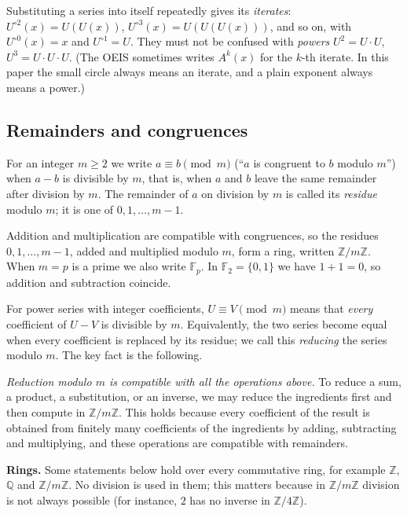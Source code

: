 \documentclass[11pt,a4paper]{article}
\theoremstyle{definition}
\theoremstyle{remark}
\newcommand{\Z}{\mathbb{Z}}
\newcommand{\Q}{\mathbb{Q}}
\newcommand{\F}{\mathbb{F}}
\newcommand{\para}[1]{\par\medskip\noindent\textbf{#1}\enspace}
\begin{document}
Substituting a series into itself repeatedly gives its \emph{iterates}: $U^{\circ2}(x)=U(U(x))$,
$U^{\circ3}(x)=U(U(U(x)))$, and so on, with $U^{\circ0}(x)=x$ and $U^{\circ1}=U$. They must not be confused with
\emph{powers} $U^2=U\cdot U$, $U^3=U\cdot U\cdot U$. (The OEIS sometimes writes $A^k(x)$ for the $k$-th iterate. In
this paper the small circle always means an iterate, and a plain exponent always means a power.)

\subsection{Remainders and congruences}
For an integer $m\ge2$ we write $a\equiv b\pmod m$ (``$a$ is congruent to $b$ modulo $m$'') when $a-b$ is divisible by
$m$, that is, when $a$ and $b$ leave the same remainder after division by $m$. The remainder of $a$ on division by
$m$ is called its \emph{residue} modulo $m$; it is one of $0,1,\dots,m-1$.

Addition and multiplication are compatible with congruences, so the residues $0,1,\dots,m-1$, added and multiplied
modulo $m$, form a ring, written $\Z/m\Z$. When $m=p$ is a prime we also write $\F_p$. In $\F_2=\{0,1\}$ we have $1+1=0$,
so addition and subtraction coincide.

For power series with integer coefficients, $U\equiv V\pmod m$ means that \emph{every} coefficient of $U-V$ is
divisible by $m$. Equivalently, the two series become equal when every coefficient is replaced by its residue; we call
this \emph{reducing} the series modulo $m$. The key fact is the following.

\emph{Reduction modulo $m$ is compatible with all the operations above.} To reduce a sum, a product, a substitution, or
an inverse, we may reduce the ingredients first and then compute in $\Z/m\Z$. This holds because every
coefficient of the result is obtained from finitely many coefficients of the ingredients by adding, subtracting and
multiplying, and these operations are compatible with remainders.

\para{Rings.} Some statements below hold over every commutative ring, for example $\Z$, $\Q$ and $\Z/m\Z$. No
division is used in them; this matters because in $\Z/m\Z$ division is not always possible (for instance, $2$ has no inverse in
$\Z/4\Z$).
\end{document}
